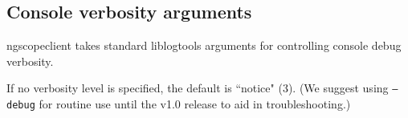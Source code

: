 \subsection{Console verbosity arguments}

ngscopeclient takes standard liblogtools arguments for controlling console debug verbosity.

If no verbosity level is specified, the default is ``notice" (3). (We suggest using \texttt{--debug} for routine use
until the v1.0 release to aid in troubleshooting.)

